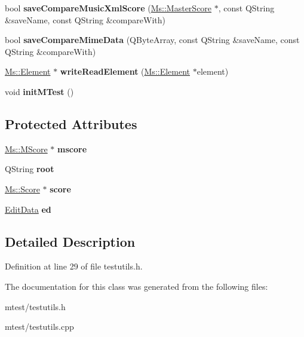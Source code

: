 \begin{DoxyCompactItemize}
\item 
\mbox{\label{class_ms_1_1_m_test_a5c0af7fbce856e84aeda9c6699e2eeca}} 
bool {\bfseries save\+Compare\+Music\+Xml\+Score} (\hyperlink{class_ms_1_1_master_score}{Ms\+::\+Master\+Score} $\ast$, const Q\+String \&save\+Name, const Q\+String \&compare\+With)
\item 
\mbox{\label{class_ms_1_1_m_test_a3014ea5ea6a33451fd5b26becb07cf7d}} 
bool {\bfseries save\+Compare\+Mime\+Data} (Q\+Byte\+Array, const Q\+String \&save\+Name, const Q\+String \&compare\+With)
\item 
\mbox{\label{class_ms_1_1_m_test_a752b054eee21c04a6084af6672447499}} 
\hyperlink{class_ms_1_1_element}{Ms\+::\+Element} $\ast$ {\bfseries write\+Read\+Element} (\hyperlink{class_ms_1_1_element}{Ms\+::\+Element} $\ast$element)
\item 
\mbox{\label{class_ms_1_1_m_test_a0bf5210cc1ee4587d6959899aaff4a14}} 
void {\bfseries init\+M\+Test} ()
\end{DoxyCompactItemize}
\subsection*{Protected Attributes}
\begin{DoxyCompactItemize}
\item 
\mbox{\label{class_ms_1_1_m_test_a62fa3697bed02fa431b025df0457763e}} 
\hyperlink{class_ms_1_1_m_score}{Ms\+::\+M\+Score} $\ast$ {\bfseries mscore}
\item 
\mbox{\label{class_ms_1_1_m_test_a1891a6553283a1d3fda0aace440d359e}} 
Q\+String {\bfseries root}
\item 
\mbox{\label{class_ms_1_1_m_test_a7ae6f01386275392b5c840ad6e8006f4}} 
\hyperlink{class_ms_1_1_score}{Ms\+::\+Score} $\ast$ {\bfseries score}
\item 
\mbox{\label{class_ms_1_1_m_test_a47c4f40157a350d27906dc6331e6cfd9}} 
\hyperlink{class_ms_1_1_edit_data}{Edit\+Data} {\bfseries ed}
\end{DoxyCompactItemize}


\subsection{Detailed Description}


Definition at line 29 of file testutils.\+h.



The documentation for this class was generated from the following files\+:\begin{DoxyCompactItemize}
\item 
mtest/testutils.\+h\item 
mtest/testutils.\+cpp\end{DoxyCompactItemize}
